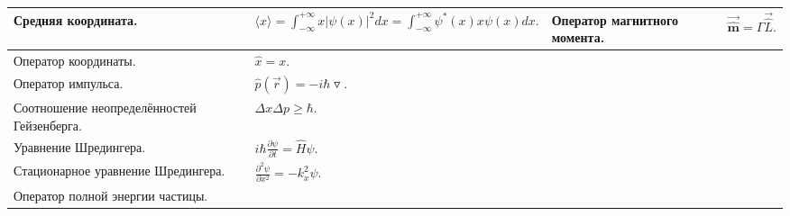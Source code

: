 \documentclass{article}
\begin{document}
\begin{tabular}{ |p{5cm}|p{4.5cm}|p{5cm}|p{4.5cm}|  }
\hline
Средняя координата.                                                          &  %
$
\langle x \rangle = 
\int_{-\infty}^{+\infty} x |\psi(x)|^2 dx = 
\int_{-\infty}^{+\infty} \psi^*(x) x \psi(x) dx.
$                                                                            &  %
Оператор магнитного момента.                                                 &  %
$\vec{\hat{\pmb{m}}} = \Gamma \vec{\hat{L}}.$                                \\ %
\hline
Оператор координаты.                                                         &  %
$\hat{x} = x.$                                                               &  %
                                                                             &  %
                                                                             \\ %
\hline
Оператор импульса.                                                           &  %
$\hat{p}(\vec{r}) = -i\hbar \triangledown.$                                  &  %
                                                                             &  %
                                                                             \\ %
\hline
Соотношение неопределённостей Гейзенберга.                                   &  %
$\Delta x \Delta p \geq \hbar.$                                              &  %
                                                                             &  %
                                                                             \\ %
\hline
Уравнение Шредингера.                                                        &  %
$i \hbar \frac{\partial \psi}{\partial t} = \hat{H} \psi.$                   &  %
                                                                             &  %
                                                                             \\ %
\hline
Стационарное уравнение Шредингера.                                           &  %
$\frac{\partial^2 \psi}{\partial x^2} = -k_x^2 \psi.$                        &  %
                                                                             &  %
                                                                             \\ %
\hline
Оператор полной энергии частицы.                                             &  %

\end{tabular}
\end{document}
